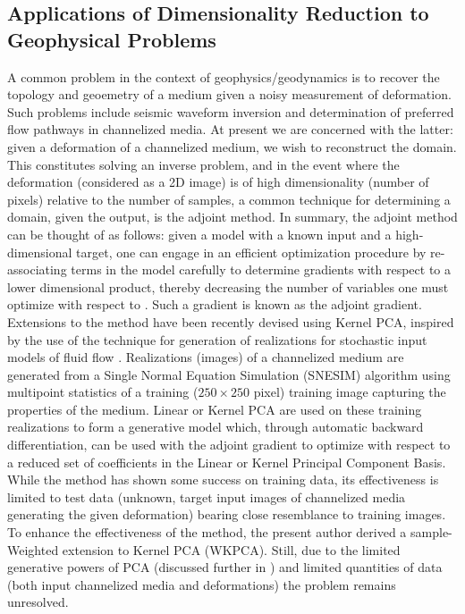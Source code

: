\documentclass{article}
\begin{document}
\subsection{Applications of Dimensionality Reduction to Geophysical Problems }\label{intokpca}
	A common problem in the context of geophysics/geodynamics is to recover the topology and geoemetry of a medium given a noisy measurement of deformation.  Such problems include seismic waveform inversion and determination of preferred flow pathways in channelized media.  At present we are concerned with the latter: given a deformation of a channelized medium, we wish to reconstruct the domain.  This constitutes solving an inverse problem, and in the event where the deformation (considered as a 2D image) is of high dimensionality (number of pixels) relative to the number of samples, a common technique for determining a domain, given the output, is the adjoint method.  In summary, the adjoint method can be thought of as follows: given a model with a known input and a high-dimensional target, one can engage in an efficient optimization procedure by re-associating terms in the model carefully to determine gradients with respect to a lower dimensional product, thereby decreasing the number of variables one must optimize with respect to \cite{Oberai2003SolutionMethod}.  Such a gradient is known as the adjoint gradient.
Extensions to the method have been recently devised using Kernel PCA, inspired by the use of the technique for generation of realizations for stochastic input models of fluid flow \cite{Ma2011KernelGeneration}.  Realizations (images) of a channelized medium are generated from a Single Normal Equation Simulation (SNESIM) algorithm using multipoint statistics of a training ($250 \times 250$ pixel) training image capturing the properties of the medium.  Linear or Kernel PCA are used on these training realizations to form a generative model which, through automatic backward differentiation, can be used with the adjoint gradient to optimize with respect to a reduced set of coefficients in the Linear or Kernel Principal Component Basis.  While the method has shown some success on training data, its effectiveness is limited to test data (unknown, target input images of channelized media generating the given deformation) bearing close resemblance to training images.
To enhance the effectiveness of the method, the present author derived a sample-Weighted extension to Kernel PCA (WKPCA).  Still, due to the limited generative powers of PCA (discussed further in \label{related}) and limited quantities of data (both input channelized media and deformations) the problem remains unresolved.  
\end{document}
